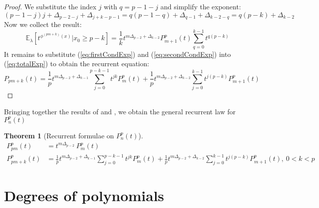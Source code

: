 \documentclass[a4paper]{article}
\theoremstyle{plain}
\newtheorem{theorem}{Theorem}[section]
\theoremstyle{definition}
\begin{document}
\begin{proof}
We substitute the index $j$ with $q = p-1-j$ and simplify the exponent:
$$  (p-1-j) j + \Delta_{p-2-j} + \Delta_{j+k-p-1} =
    q(p-1-q) + \Delta_{q-1} + \Delta_{k-2-q}=
   q(p-k)+\Delta_{k-2} 
$$   
Now we collect the result: 
\begin{equation}\label{eq:secondCondExp}
\mathbb{E}_\lambda\left[ t^{\phi^{(pm+k)}(x)}| x_0 \ge p-k \right] 
 =  \frac{1}{k} t^{m\Delta_{p-2} + \Delta_{k-2}} P_{m+1}^p(t)
  \sum\limits_{q=0}^{k-1} t^{q(p-k)}
  \end{equation}
It remains to substitute (\ref{eq:firstCondExp}) and (\ref{eq:secondCondExp}) into (\ref{eq:totalExp}) to obtain the recurrent equation:
$$P_{pm+k}(t)  =   \frac{1}{p} t^{m\Delta_{p-2} + \Delta_{k-1}}\sum\limits_{j=0}^{p-k-1} t^{jk} P_m^p(t) 
      + \frac{1}{p} t^{m\Delta_{p-2} + \Delta_{k-2}}\sum\limits_{j=0}^{k-1} t^{j(p-k)} P_{m+1}^p(t) $$
\end{proof}
Bringing together the results of  and , we obtain the general recurrent law for $P_{n}^p(t)$
\begin{theorem}[Recurrent formulae on $P_{n}^p(t)$] 
\begin{align}
\label{P_pm} P_{pm}^p(t) & =  t^{m\Delta_{p-2}}\ P_m^p(t) \\
\label{P_pm+k} P_{pm+k}^p(t) & =  \frac{1}{p} t^{m\Delta_{p-2} + \Delta_{k-1}}\sum\limits_{j=0}^{p-k-1} t^{jk} P_m^p(t)  + \frac{1}{p} t^{m\Delta_{p-2} + \Delta_{k-2}}\sum\limits_{j=0}^{k-1} t^{j(p-k)} P_{m+1}^p(t), \ 0 < k < p
 \end{align}
\end{theorem}


\section{Degrees of polynomials}
\end{document}
